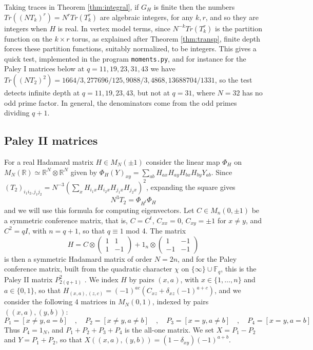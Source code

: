 \documentclass[11pt]{amsart}
\begin{document}
Taking traces in Theorem \ref{thm:integral}, if $G_H$ is finite then the numbers $Tr((NT_k)^r)=N^rTr(T_k^r)$ are algebraic integers, for any $k,r$, and so they are integers when $H$ is real. In vertex model terms, since $N^{-k}Tr(T_k^r)$ is the partition function on the $k\times r$ torus, as explained after Theorem \ref{thm:transp}, finite depth forces these partition functions, suitably normalized, to be integers. This gives a quick test, implemented in the program \texttt{moments.py}, and for instance for the Paley I matrices below at $q=11,19,23,31,43$ we have $Tr((NT_2)^2)=1664/3,277696/125,9088/3,4868,13688704/1331$, so the test detects infinite depth at $q=11,19,23,43$, but not at $q=31$, where $N=32$ has no odd prime factor. In general, the denominators come from the odd primes dividing $q+1$.

\subsection{Paley II matrices}\label{sec:paley2}

For a real Hadamard matrix $H\in M_N(\pm1)$ consider the linear map $\Phi_H$ on $M_N(\mathbb R)\simeq\mathbb R^N\otimes\mathbb R^N$ given by $\Phi_H(Y)_{xy}=\sum_{ab}H_{ax}H_{ay}H_{bx}H_{by}Y_{ab}$. Since $(T_2)_{i_1i_2,j_1j_2}=N^{-3}(\sum_xH_{i_1x}H_{i_2x}H_{j_1x}H_{j_2x})^2$, expanding the square gives
$$N^3T_2=\Phi_{H^t}\Phi_H$$
and we will use this formula for computing eigenvectors. Let $C\in M_n(0,\pm1)$ be a symmetric conference matrix, that is, $C=C^t$, $C_{xx}=0$, $C_{xy}=\pm1$ for $x\neq y$, and $C^2=qI$, with $n=q+1$, so that $q\equiv1$ mod 4. The matrix
$$H=C\otimes\begin{pmatrix}1&1\\1&-1\end{pmatrix}+1_n\otimes\begin{pmatrix}1&-1\\-1&-1\end{pmatrix}$$
is then a symmetric Hadamard matrix of order $N=2n$, and for the Paley conference matrix, built from the quadratic character $\chi$ on $\{\infty\}\cup\mathbb F_q$, this is the Paley II matrix $P^2_{2(q+1)}$ \cite{pal}. We index $H$ by pairs $(x,a)$, with $x\in\{1,\ldots,n\}$ and $a\in\{0,1\}$, so that $H_{(x,a),(z,c)}=(-1)^{ac}(C_{xz}+\delta_{xz}(-1)^{a+c})$, and we consider the following 4 matrices in $M_N(0,1)$, indexed by pairs $((x,a),(y,b))$:
$$P_1=[x\neq y,a=b]\quad,\quad P_2=[x\neq y,a\neq b]\quad,\quad P_3=[x=y,a\neq b]\quad,\quad P_4=[x=y,a=b]$$
Thus $P_4=1_N$, and $P_1+P_2+P_3+P_4$ is the all-one matrix. We set $X=P_1-P_2$ and $Y=P_1+P_2$, so that $X((x,a),(y,b))=(1-\delta_{xy})(-1)^{a+b}$.
\end{document}
